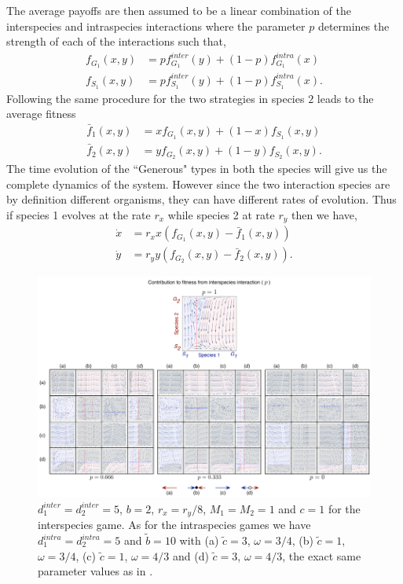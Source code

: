 \documentclass[12pt]{article}
\begin{document}
\begin{appendices}
The average payoffs are then assumed to be a linear combination of the interspecies and intraspecies interactions where the parameter $p$ determines the strength of each of the interactions such that,
%
\begin{align}
	f_{G_1} (x,y) &= p f^{inter}_{G_1} (y) + (1-p) f^{intra}_{G_1} (x) \nonumber \\
	f_{S_1} (x,y) &= p f^{inter}_{S_1} (y) + (1-p) f^{intra}_{S_1} (x).
\label{fiteqs}
\end{align}
%
Following the same procedure for the two strategies in species $2$ leads to the average fitness
%
\begin{align}
\bar{f}_1 (x,y) &= x f_{G_1} (x,y)+(1-x) f_ {S_1}(x,y) \nonumber \\
\bar{f}_2 (x,y) &= y f_{G_2} (x,y)+(1-y) f_{S_2}(x,y).
\label{avgfiteqs}
\end{align}
%
The time evolution of the ``Generous" types in both the species will give us the complete dynamics of the system.
However since the two interaction species are by definition different organisms, they can have different rates of evolution.
Thus if species 1 evolves at the rate $r_x$ while species 2 at rate $r_y$ then we have,
\begin{align}
\dot{x} &= r_x x \left(f_{G_1}(x,y) -  \bar{f}_1(x,y) \right) \nonumber \\
\dot{y} &= r_y y \left(f_{G_2}(x,y) -  \bar{f}_2(x,y) \right).
\label{eq:repeqapp}
\end{align}


\begin{figure}[h]
\begin{center}
\includegraphics[width=\columnwidth]{../Figures/Dynamicsacrossp_reduced.pdf}
\caption{
$d_1^{inter} = d_2^{inter} = 5$, $b = 2$, $r_x = r_y/8$, $M_1 = M_2 = 1$ and $c=1$ for the interspecies game. As for the intraspecies games we have $d_1^{intra} = d_2^{intra} = 5$ and $\tilde{b} = 10 $ with 
(a) $\tilde{c} = 3$, $\omega = 3/4$, 
(b) $\tilde{c} = 1$, $\omega = 3/4$, 
(c) $\tilde{c} = 1$, $\omega = 4/3$ and 
(d) $\tilde{c} = 3$, $\omega = 4/3$, the exact same parameter values as in \citep{hauert:JTB:2006a}.
\label{fig:appendix}
}
\end{center}
\end{figure}



\end{appendices}
\end{document}
